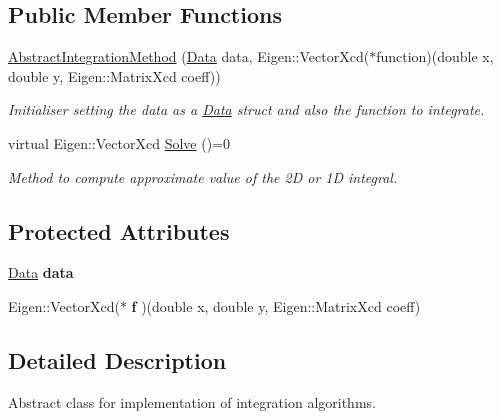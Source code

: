 \subsection*{Public Member Functions}
\begin{DoxyCompactItemize}
\item 
\mbox{\label{class_abstract_integration_method_a2b3a0208c99564d496e27b383fc4d96f}} 
\hyperlink{class_abstract_integration_method_a2b3a0208c99564d496e27b383fc4d96f}{Abstract\+Integration\+Method} (\hyperlink{struct_data}{Data} data, Eigen\+::\+Vector\+Xcd($\ast$function)(double x, double y, Eigen\+::\+Matrix\+Xcd coeff))
\begin{DoxyCompactList}\small\item\em Initialiser setting the data as a \hyperlink{struct_data}{Data} struct and also the function to integrate. \end{DoxyCompactList}\item 
virtual Eigen\+::\+Vector\+Xcd \hyperlink{class_abstract_integration_method_af76e5bdce7d0b139d07e920fa29c1c34}{Solve} ()=0
\begin{DoxyCompactList}\small\item\em Method to compute approximate value of the 2D or 1D integral. \end{DoxyCompactList}\end{DoxyCompactItemize}
\subsection*{Protected Attributes}
\begin{DoxyCompactItemize}
\item 
\mbox{\label{class_abstract_integration_method_a534b5ff7dfbccc1332cfbe66e817b389}} 
\hyperlink{struct_data}{Data} {\bfseries data}
\item 
\mbox{\label{class_abstract_integration_method_a4de4f7ee55737b4f05f2b02649bf5ea0}} 
Eigen\+::\+Vector\+Xcd($\ast$ {\bfseries f} )(double x, double y, Eigen\+::\+Matrix\+Xcd coeff)
\end{DoxyCompactItemize}


\subsection{Detailed Description}
Abstract class for implementation of integration algorithms. 

